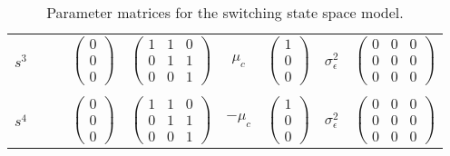 \documentclass[12pt]{article}
\begin{document}
\begin{table}
\begin{tabular}[h!]{@{}llccccccc@{}}
  \\
  $s^3$ & && $\begin{pmatrix} 0 \\ 0 \\ 0 \end{pmatrix}$ & $\begin{pmatrix} 1&1&0 \\ 0&1&1 \\ 0&0&1 \end{pmatrix}$ & $\mu_c$ & $\begin{pmatrix} 1\\ 0 \\ 0 \end{pmatrix}$ & $\sigma_\epsilon^2$ & $\begin{pmatrix} 0&0&0 \\ 0&0&0 \\ 0&0&0 \end{pmatrix}$\\
  \\
  $s^4$ & && $\begin{pmatrix} 0 \\ 0 \\ 0 \end{pmatrix}$ & $\begin{pmatrix} 1&1&0 \\ 0&1&1 \\ 0&0&1 \end{pmatrix}$ & $-\mu_c$ & $\begin{pmatrix} 1\\ 0 \\ 0 \end{pmatrix}$ & $\sigma_\epsilon^2$ & $\begin{pmatrix} 0&0&0 \\ 0&0&0 \\ 0&0&0 \end{pmatrix}$\\

\bottomrule
\end{tabular}
\caption{Parameter matrices for the switching state space model.\label{tab:parmats}}
\end{table}
\end{document}
